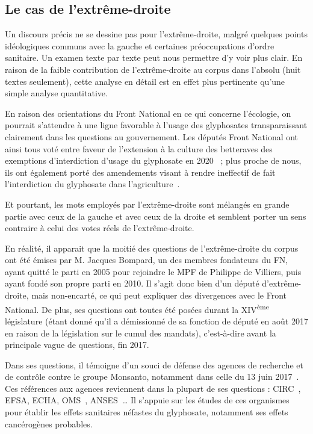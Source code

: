 \documentclass[12pt,twocolumn,landscape]{article}
\begin{document}
    \subsection{Le cas de l'extrême-droite}\label{subsec:le-cas-de-l'extreme-droite}

    Un discours précis ne se dessine pas pour l'extrême-droite,
    malgré quelques points idéologiques communs avec la gauche
    et certaines préoccupations d'ordre sanitaire.
    Un examen texte par texte peut nous permettre d'y voir plus clair.
    En raison de la faible contribution de l'extrême-droite
    au corpus dans l'absolu (huit textes seulement), cette analyse en détail est en
    effet plus pertinente qu'une simple analyse quantitative.

    En raison des orientations du Front National en ce qui concerne
    l'écologie, on pourrait s'attendre à une ligne favorable à l'usage
    des glyphosates transparaissant clairement dans les questions
    au gouvernement.
    Les députés Front National ont ainsi tous voté entre faveur
    de l'extension à la culture des betteraves des exemptions
    d'interdiction d'usage du glyphosate en 2020~\cite{vote-glyphosate} ;
    plus proche de nous, ils ont également porté des amendements
    visant à rendre ineffectif de fait l'interdiction du glyphosate
    dans l'agriculture~\cite{amendement-glyphosate}.

    Et pourtant, les mots employés par l'extrême-droite sont
    mélangés en grande partie avec ceux de la gauche et avec
    ceux de la droite et semblent porter un sens
    contraire à celui des votes réels de l'extrême-droite.

    En réalité, il apparait que la moitié des questions de l'extrême-droite
    du corpus ont été émises par M. Jacques Bompard, un des membres fondateurs
    du FN, ayant quitté le parti en 2005 pour rejoindre le MPF de Philippe
    de Villiers, puis ayant fondé son propre parti en 2010.
    Il s'agit donc bien d'un député d'extrême-droite, mais non-encarté,
    ce qui peut expliquer des divergences avec le Front National.
    De plus, ses questions ont toutes été posées durant la XIV\textsuperscript{ème}
    législature (étant donné qu'il a démissionné de sa fonction de député en août
    2017 en raison de la législation sur le cumul des mandats),
    c'est-à-dire avant la principale vague de questions, fin 2017.

    Dans ses questions, il témoigne d'un souci de défense des agences de
    recherche et de contrôle contre le groupe Monsanto,
    notamment dans celle du 13 juin 2017~\cite{bombard-question}.
    Ces références aux agences reviennent dans la plupart de ses questions :
    CIRC~\cite{bombard-question}, EFSA, ECHA, OMS~\cite{bombard-question-2},
    ANSES~\cite{bombard-question-3}\ldots
    Il s'appuie sur les études de ces organismes pour établir
    les effets sanitaires néfastes du glyphosate, notamment
    ses effets cancérogènes probables.
\end{document}
